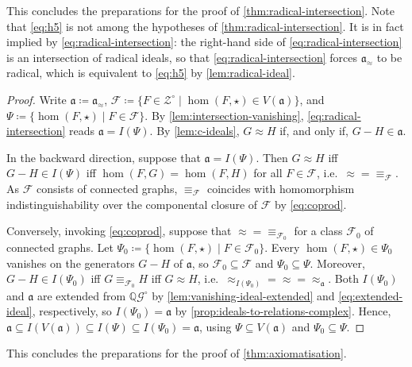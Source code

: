 \documentclass[11pt]{scrartcl}
\theoremstyle{definition}
\theoremstyle{plain}
\theoremstyle{remark}
\newcommand{\lG}{\mathcal{G}^\circ}
\newcommand{\lZ}{\mathcal{Z}^\circ}
\begin{document}
    This concludes the preparations for the proof of \cref{thm:radical-intersection}.
    Note that \eqref{eq:h5} is not among the hypotheses of \cref{thm:radical-intersection}.
	It is in fact implied by \eqref{eq:radical-intersection}:
	the right-hand side of \eqref{eq:radical-intersection} is an intersection of radical ideals,
	so that \eqref{eq:radical-intersection} forces $\mathfrak{a}_{\approx}$ to be radical,
	which is equivalent to \eqref{eq:h5} by \cref{lem:radical-ideal}.
    
	\thmRadInt*
	\begin{proof}
		Write $\mathfrak{a} \coloneqq \mathfrak{a}_{\approx}$,
		$\mathcal{F} \coloneqq \{F \in \lZ \mid \hom(F, \star) \in V(\mathfrak{a})\}$,
		and $\Psi \coloneqq \{\hom(F, \star) \mid F \in \mathcal{F}\}$.
		By \cref{lem:intersection-vanishing}, \eqref{eq:radical-intersection} reads $\mathfrak{a} = I(\Psi)$.
		By \cref{lem:c-ideals}, $G \approx H$ if, and only if, $G - H \in \mathfrak{a}$.

        In the backward direction,
		suppose that $\mathfrak{a} = I(\Psi)$.
		Then $G \approx H$ iff $G - H \in I(\Psi)$ iff $\hom(F, G) = \hom(F, H)$ for all $F \in \mathcal{F}$,
		i.e.\ ${\approx} = {\equiv_{\mathcal{F}}}$.
		As $\mathcal{F}$ consists of connected graphs, ${\equiv_{\mathcal{F}}}$ coincides with homomorphism indistinguishability over the componental closure of $\mathcal{F}$ by \eqref{eq:coprod}.

		Conversely, invoking \cref{eq:coprod}, suppose that ${\approx} = {\equiv_{\mathcal{F}_0}}$ for a class $\mathcal{F}_0$ of connected graphs.
		Let $\Psi_0 \coloneqq \{\hom(F, \star) \mid F \in \mathcal{F}_0\}$.
		Every $\hom(F, \star) \in \Psi_0$ vanishes on the generators $G - H$ of $\mathfrak{a}$,
		so $\mathcal{F}_0 \subseteq \mathcal{F}$ and $\Psi_0 \subseteq \Psi$.
		Moreover, $G - H \in I(\Psi_0)$ iff $G \equiv_{\mathcal{F}_0} H$ iff $G \approx H$,
		i.e.\ ${\approx_{I(\Psi_0)}} = {\approx} = {\approx_{\mathfrak{a}}}$.
		Both $I(\Psi_0)$ and $\mathfrak{a}$ are extended from $\mathbb{Q}\lG$
		by \cref{lem:vanishing-ideal-extended} and \eqref{eq:extended-ideal}, respectively,
		so $I(\Psi_0) = \mathfrak{a}$ by \cref{prop:ideals-to-relations-complex}.
		Hence,
		$\mathfrak{a} \subseteq I(V(\mathfrak{a})) \subseteq I(\Psi) \subseteq I(\Psi_0) = \mathfrak{a}$,
		using $\Psi \subseteq V(\mathfrak{a})$ and $\Psi_0 \subseteq \Psi$.
	\end{proof}

	This concludes the preparations for the proof of \cref{thm:axiomatisation}.
\end{document}
